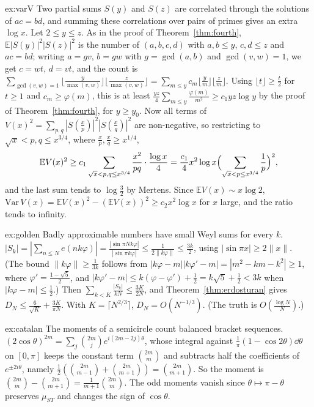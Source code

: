\begin{solution}{ex:varV}
\idea Two partial sums $S(y)$ and $S(z)$ are correlated through the solutions of $ac=bd$, and summing these correlations over pairs of primes gives an extra $\log x$.
\writeup Let $2\le y\le z$. As in the proof of Theorem~\ref{thm:fourth}, $\mathbb E|S(y)|^2|S(z)|^2$ is the number of $(a,b,c,d)$ with $a,b\le y$, $c,d\le z$ and $ac=bd$; writing $a=gv$, $b=gw$ with $g=\gcd(a,b)$ and $\gcd(v,w)=1$, we get $c=wt$, $d=vt$, and the count is $\sum_{\gcd(v,w)=1}\lfloor\frac y{\max(v,w)}\rfloor\lfloor\frac z{\max(v,w)}\rfloor=\sum_{m\le y}c_m\lfloor\frac ym\rfloor\lfloor\frac zm\rfloor$. Using $\lfloor t\rfloor\ge\frac t2$ for $t\ge1$ and $c_m\ge\varphi(m)$, this is at least $\frac{yz}4\sum_{m\le y}\frac{\varphi(m)}{m^2}\ge c_1yz\log y$ by the proof of Theorem~\ref{thm:fourth}, for $y\ge y_0$. Now all terms of $V(x)^2=\sum_{p,q}|S(\frac xp)|^2|S(\frac xq)|^2$ are non-negative, so restricting to $\sqrt x<p,q\le x^{3/4}$, where $\frac xp,\frac xq\ge x^{1/4}$,
\[
\mathbb EV(x)^2\ge c_1\sum_{\sqrt x<p,q\le x^{3/4}}\frac{x^2}{pq}\cdot\frac{\log x}4=\frac{c_1}4x^2\log x\Bigl(\sum_{\sqrt x<p\le x^{3/4}}\frac1p\Bigr)^2,
\]
and the last sum tends to $\log\frac32$ by Mertens. Since $\mathbb EV(x)\sim x\log2$, $\mathrm{Var}\,V(x)=\mathbb EV(x)^2-(\mathbb EV(x))^2\ge c_2x^2\log x$ for $x$ large, and the ratio tends to infinity.
\end{solution}



\begin{solution}{ex:golden}
\idea Badly approximable numbers have small Weyl sums for every $k$.
\writeup $|S_k|=|\sum_{n\le N}e(nk\varphi)|=\frac{|\sin\pi Nk\varphi|}{|\sin\pi k\varphi|}\le\frac1{2\|k\varphi\|}\le\frac{3k}2$, using $|\sin\pi x|\ge2\|x\|$. (The bound $\|k\varphi\|\ge\frac1{3k}$ follows from $|k\varphi-m||k\varphi'-m|=|m^2-km-k^2|\ge1$, where $\varphi'=\frac{1-\sqrt5}2$, and $|k\varphi'-m|\le k(\varphi-\varphi')+\frac12=k\sqrt5+\frac12<3k$ when $|k\varphi-m|\le\frac12$.) Then $\sum_{k<K}\frac{|S_k|}{kN}\le\frac{3K}{2N}$, and Theorem~\ref{thm:erdosturan} gives $D_N\le\frac6{\sqrt K}+\frac{3K}{\pi N}$. With $K=\lceil N^{2/3}\rceil$, $D_N=O(N^{-1/3})$. (The truth is $O(\frac{\log N}N)$.)
\end{solution}

\begin{solution}{ex:catalan}
\idea The moments of a semicircle count balanced bracket sequences.
\writeup $(2\cos\theta)^{2m}=\sum_j\binom{2m}je^{i(2m-2j)\theta}$, whose integral against $\frac1\pi(1-\cos2\theta)\dd\theta$ on $[0,\pi]$ keeps the constant term $\binom{2m}m$ and subtracts half the coefficients of $e^{\pm2i\theta}$, namely $\frac12(\binom{2m}{m-1}+\binom{2m}{m+1})=\binom{2m}{m+1}$. So the moment is $\binom{2m}m-\binom{2m}{m+1}=\frac1{m+1}\binom{2m}m$. The odd moments vanish since $\theta\mapsto\pi-\theta$ preserves $\mu_{ST}$ and changes the sign of $\cos\theta$.
\end{solution}

